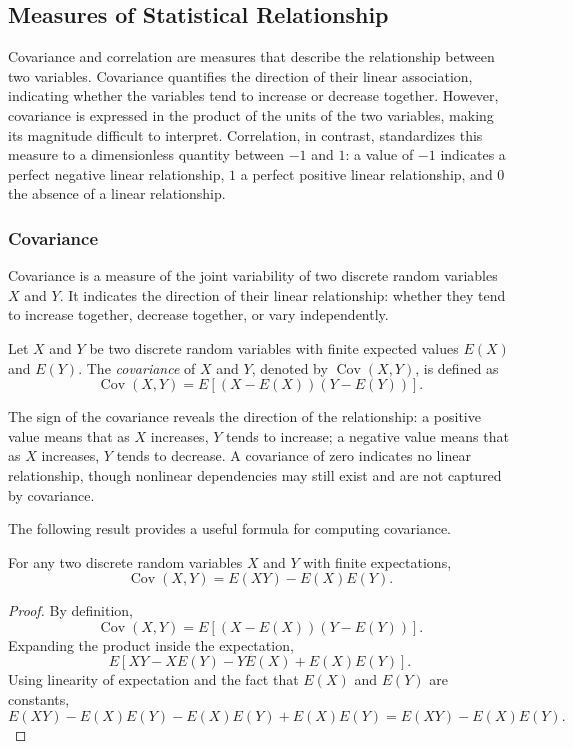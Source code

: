 %
%

\subsection{Measures of Statistical Relationship}

Covariance and correlation are measures that describe the relationship between two variables. Covariance quantifies the direction of their linear association, indicating whether the variables tend to increase or decrease together. However, covariance is expressed in the product of the units of the two variables, making its magnitude difficult to interpret. Correlation, in contrast, standardizes this measure to a dimensionless quantity between $-1$ and $1$: a value of $-1$ indicates a perfect negative linear relationship, $1$ a perfect positive linear relationship, and $0$ the absence of a linear relationship.


\subsubsection*{Covariance}

Covariance is a measure of the joint variability of two discrete random variables $X$ and $Y$. It indicates the direction of their linear relationship: whether they tend to increase together, decrease together, or vary independently.

\begin{definition}
Let $X$ and $Y$ be two discrete random variables with finite expected values $E(X)$ and $E(Y)$. The \emph{covariance} of $X$ and $Y$, denoted by $\operatorname{Cov}(X, Y)$, is defined as
\[
\operatorname{Cov}(X, Y) = E\!\left[(X - E(X))(Y - E(Y))\right].
\]
\end{definition}

The sign of the covariance reveals the direction of the relationship: a positive value means that as $X$ increases, $Y$ tends to increase; a negative value means that as $X$ increases, $Y$ tends to decrease. A covariance of zero indicates no linear relationship, though nonlinear dependencies may still exist and are not captured by covariance.

The following result provides a useful formula for computing covariance.

\begin{proposition}
For any two discrete random variables $X$ and $Y$ with finite expectations,
\[
\operatorname{Cov}(X,Y) = E(XY) - E(X)E(Y).
\]
\end{proposition}
\begin{proof}
By definition,
\[
\operatorname{Cov}(X,Y) = E\left[(X - E(X))(Y - E(Y))\right].
\]
Expanding the product inside the expectation,
\[
E[XY - X E(Y) - Y E(X) + E(X)E(Y)].
\]
Using linearity of expectation and the fact that $E(X)$ and $E(Y)$ are constants,
\[
E(XY) - E(X)E(Y) - E(X)E(Y) + E(X)E(Y) = E(XY) - E(X)E(Y).
\]
\end{proof}

